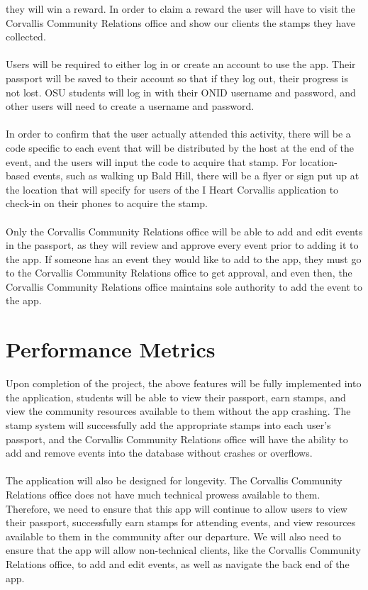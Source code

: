 \documentclass[draftclsnofoot, onecolumn, 10pt, compsoc]{IEEEtran}
\begin{document}
		they will win a reward. In order to claim a reward the user will have to visit the Corvallis Community Relations office 
		and show our clients the stamps they have collected. \\ \\			
		Users will be required to either log in or create an account to use the app. Their passport will be saved to their account 
		so that if they log out, their progress is not lost. OSU students will log in with their ONID username and password, and 
		other users will need to create a username and password.\\ \\			
		In order to confirm that the user actually attended this activity, there will be a code specific to each event that will be 
		distributed by the host at the end of the event, and the users will input the code to acquire that stamp. For location-
		based events, such as walking up Bald Hill, there will be a flyer or sign put up at the location that will specify for users 
		of the I Heart Corvallis application to check-in on their phones to acquire the stamp. \\ \\			
		Only the Corvallis Community Relations office will be able to add and edit events in the passport, as they will review 
		and approve every event prior to adding it to the app. If someone has an event they would like to add to the app, they 
		must go to the Corvallis Community Relations office to get approval, and even then, the Corvallis Community 
		Relations office maintains sole authority to add the event to the app.
	
	\section{Performance Metrics}
		Upon completion of the project, the above features will be fully implemented into the application, students will be able 
		to view their passport, earn stamps, and view the community resources available to them without the app crashing. 
		The stamp system will successfully add the appropriate stamps into each user's passport, and the Corvallis 
		Community Relations office will have the ability to add and remove events into the database without crashes or 
		overflows. \\ \\
		The application will also be designed for longevity. The Corvallis Community Relations office does not have much 
		technical prowess available to them. Therefore, we need to ensure that this app will continue to allow users to view 
		their passport, successfully earn stamps for attending events, and view resources available to them in the community 
		after our departure. We will also need to ensure that the app will allow non-technical clients, like the Corvallis 
		Community Relations office, to add and edit events, as well as navigate the back end of the app.
	
\end{document}
